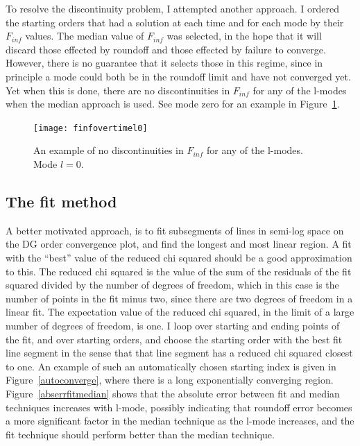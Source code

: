 To resolve the discontinuity problem, I attempted another approach. I ordered the starting orders that had a solution at each time and for each mode by their $F_{inf}$ values. The median value of $F_{inf}$ was selected, in the hope that it will discard those effected by roundoff and those effected by failure to converge. However, there is no guarantee that it selects those in this regime, since in principle a mode could both be in the roundoff limit and have not converged yet. Yet when this is done, there are no discontinuities in $F_{inf}$ for any of the l-modes when the median approach is used. See mode zero for an example in Figure~\ref{modezero}.

\begin{figure}
  \texttt{[image: finfovertimel0]}
  \caption{An example of no discontinuities in $F_{inf}$ for any of the l-modes. Mode $l=0$.}
  \label{modezero}
\end{figure}


\subsection{The fit method}
A better motivated approach, is to fit subsegments of lines in semi-log space on the DG order convergence plot, and find the longest and most linear region. A fit with the ``best'' value of the reduced chi squared should be a good approximation to this. The reduced chi squared is the value of the sum of the residuals of the fit squared divided by the number of degrees of freedom, which in this case is the number of points in the fit minus two, since there are two degrees of freedom in a linear fit. The expectation value of the reduced chi squared, in the limit of a large number of degrees of freedom, is one. I loop over starting and ending points of the fit, and over starting orders, and choose the starting order with the best fit line segment in the sense that that line segment has a reduced chi squared closest to one. An example of such an automatically chosen starting index is given in Figure~\ref{autoconverge}, where there is a long exponentially converging region. Figure~\ref{abserrfitmedian} shows that the absolute error between fit and median techniques increases with l-mode, possibly indicating that roundoff error becomes a more significant factor in the median technique as the l-mode increases, and the fit technique should perform better than the median technique. 

